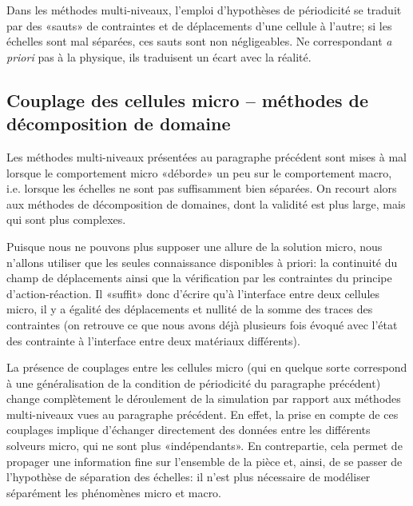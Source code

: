 Dans les méthodes multi-niveaux, l'emploi d'hypothèses de périodicité se traduit par
des «sauts» de contraintes et de déplacements d'une cellule à l'autre; si les échelles sont
mal séparées, ces sauts sont non négligeables. Ne correspondant \emph{a priori} pas à la physique,
ils traduisent un écart avec la réalité.



\medskip
\subsection{Couplage des cellules micro -- méthodes de décomposition de domaine}\label{Sec-dec}

Les méthodes multi-niveaux présentées au paragraphe précédent sont mises à mal
lorsque le comportement micro «déborde» un peu sur le comportement macro, i.e.
lorsque les échelles ne sont pas suffisamment bien séparées.
On recourt alors aux méthodes de décomposition de domaines,
dont la validité est plus large, mais qui sont plus complexes.

\medskip
Puisque nous ne pouvons plus supposer une allure de la solution micro,
nous n'allons utiliser que les seules connaissance disponibles à priori: la continuité du champ de déplacements
ainsi que la vérification par les contraintes du principe d'action-réaction. Il «suffit» donc
d'écrire qu'à l'interface entre deux cellules micro, il y a égalité des déplacements et
nullité de la somme des traces des contraintes (on retrouve ce que nous avons déjà
plusieurs fois évoqué avec l'état des contrainte à l'interface entre deux matériaux
différents).

\medskip
La présence de couplages entre les cellules micro
(qui en quelque sorte correspond à une généralisation de la condition de périodicité
du paragraphe précédent) change complètement le déroulement de la simulation par
rapport aux méthodes multi-niveaux vues au paragraphe précédent.
En effet, la prise en compte de ces couplages implique d'échanger directement des données
entre les différents solveurs micro, qui ne sont plus «indépendants».
En contrepartie, cela permet de propager une information fine sur l'ensemble de la pièce et,
ainsi, de se passer de l'hypothèse de séparation des échelles: il n'est plus nécessaire de
modéliser séparément les phénomènes micro et macro.

